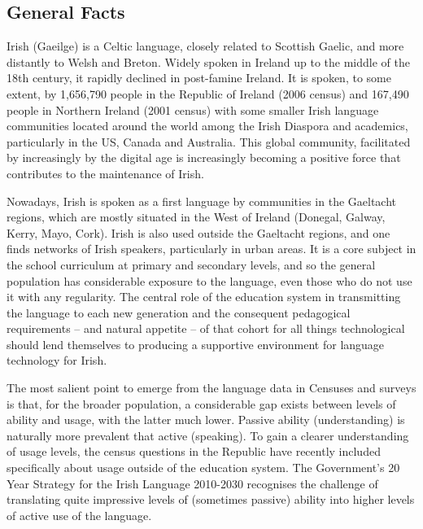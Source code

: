 \clearpage

\label{IrishInfso_en}

\begin{multicols}{2}

\subsection{General Facts}

Irish (Gaeilge) is a Celtic language, closely related to Scottish Gaelic, and more distantly to Welsh and Breton. Widely spoken in Ireland up to the middle of the 18th century, it rapidly declined in post-famine Ireland. It is spoken, to some extent, by 1,656,790 people in the Republic of Ireland (2006 census) and 167,490 people in Northern Ireland (2001 census) with some smaller Irish language communities located around the world among the Irish Diaspora and academics, particularly in the US, Canada and Australia. This global community, facilitated by increasingly by the digital age is increasingly becoming a positive force that contributes to the maintenance of Irish. 

Nowadays,  Irish is spoken as a first language by communities in the Gaeltacht regions, which are mostly situated in the West of Ireland (Donegal, Galway, Kerry, Mayo, Cork). Irish is also used outside the Gaeltacht regions, and one finds networks of Irish speakers, particularly in urban areas.   It is a core subject in the school curriculum at primary and secondary levels, and so the general population has considerable exposure to the language, even those who do not use it with any regularity. The central role of the education system in transmitting the language to each new generation \cite{oriagain97} and the consequent pedagogical requirements -- and natural appetite -- of that cohort for all things technological should lend themselves to producing a supportive environment for language technology for Irish.

The most salient point to emerge from the language data in Censuses and surveys is that, for the broader population, a considerable gap exists between levels of ability and usage, with the latter much lower. Passive ability (understanding) is naturally more prevalent that active (speaking). To gain a clearer understanding of usage levels, the census questions in the Republic have recently included specifically about usage outside of the education system. The Government's 20 Year Strategy for the Irish Language 2010-2030 recognises the challenge of translating quite impressive levels of (sometimes passive) ability into higher levels of active use of the language.


\end{multicols}
